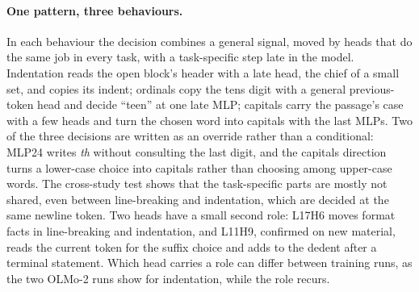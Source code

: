 \documentclass[11pt]{article}
\newcommand{\hd}[2]{L#1H#2}
\newcommand{\mlp}[1]{MLP#1}
\newcommand{\sfx}[1]{\textit{#1}}
\begin{document}
\paragraph{One pattern, three behaviours.} In each behaviour the decision combines a general signal, moved by heads that do the same job in every task, with a task-specific step late in the model. Indentation reads the open block's header with a late head, the chief of a small set, and copies its indent; ordinals copy the tens digit with a general previous-token head and decide ``teen'' at one late MLP; capitals carry the passage's case with a few heads and turn the chosen word into capitals with the last MLPs. Two of the three decisions are written as an override rather than a conditional: \mlp{24} writes \sfx{th} without consulting the last digit, and the capitals direction turns a lower-case choice into capitals rather than choosing among upper-case words. The cross-study test shows that the task-specific parts are mostly not shared, even between line-breaking and indentation, which are decided at the same newline token. Two heads have a small second role: \hd{17}{6} moves format facts in line-breaking and indentation, and \hd{11}{9}, confirmed on new material, reads the current token for the suffix choice and adds to the dedent after a terminal statement. Which head carries a role can differ between training runs, as the two OLMo-2 runs show for indentation, while the role recurs.
\end{document}
